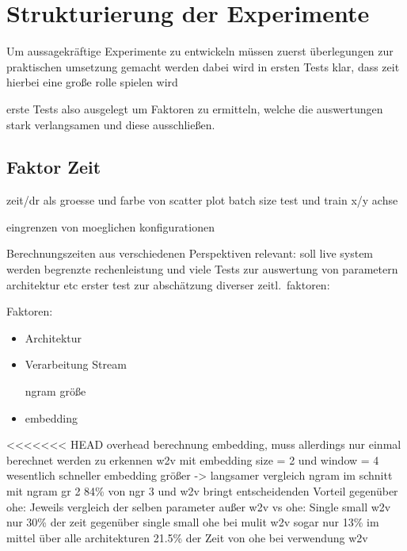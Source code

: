     \section{Strukturierung der Experimente}\label{sec:StrukExp}
        Um aussagekräftige Experimente zu entwickeln müssen zuerst 
        überlegungen zur praktischen umsetzung gemacht werden
        dabei wird in ersten Tests klar, dass zeit hierbei eine große rolle spielen wird

        erste Tests also ausgelegt um Faktoren zu ermitteln, welche die auswertungen stark verlangsamen
        und diese ausschließen.

        \subsection{Faktor Zeit}

            zeit/dr als groesse und farbe von scatter plot
            batch size test und train x/y achse

            eingrenzen von moeglichen konfigurationen

            Berechnungszeiten aus verschiedenen Perspektiven relevant:
            soll live system werden
            begrenzte rechenleistung und viele Tests zur auswertung von parametern architektur etc
            erster test zur abschätzung diverser zeitl.\ faktoren:

            Faktoren:
            \begin{itemize}
                \item Architektur
                \item Verarbeitung Stream

                     ngram größe
                \item embedding
            \end{itemize}
<<<<<<< HEAD
            overhead berechnung embedding, muss allerdings nur einmal berechnet werden
            zu erkennen w2v mit embedding size = 2  und window = 4 wesentlich schneller
            embedding größer -> langsamer
            vergleich ngram
            im schnitt mit ngram gr 2 84\% von ngr 3 und 
            w2v bringt entscheidenden Vorteil gegenüber ohe:
            Jeweils vergleich der selben parameter außer w2v vs ohe:
            Single small w2v nur 30\% der zeit gegenüber single small ohe
            bei mulit w2v sogar nur 13\%
            im mittel über alle architekturen 21.5\% der Zeit von ohe bei verwendung w2v

